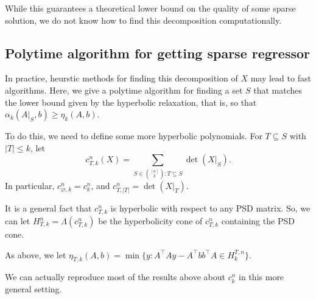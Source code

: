 \documentclass[a4paper]{article}
\newcommand{\ksets}{\binom{[n]}{k}}
\begin{document}
While this guarantees a theoretical lower bound on the quality of some sparse solution, we do not know how to find this decomposition computationally.

\subsection{Polytime algorithm for getting sparse regressor}
In practice, heurstic methods for finding this decomposition of $X$ may lead to fast algorithms.
Here, we give a polytime algorithm for finding a set $S$ that matches the lower bound given by the hyperbolic relaxation, that is, so that $\alpha_k(A|_S, b) \ge \eta_k(A, b)$.

To do this, we need to define some more hyperbolic polynomials. For $T \subseteq S$ with  $|T| \le k$, let
\[
    c_{T,k}^n(X) = \sum_{S\in \ksets : T \subseteq S} \det(X|_S).
\]
In particular, $c_{\varnothing, k}^n = c_k^n$, and $c_{T, |T|}^n = \det(X|_T)$.

It is a general fact that $c_{T,k}^n$ is hyperbolic with respect to any PSD matrix.
So, we can let $H_{T, k}^n = \Lambda(c_{T,k}^n)$ be the hyperbolicity cone of $c_{T,k}^n$ containing the PSD cone.

As above, we let $\eta_{T, k}(A,b) = \min \{y : A^{\intercal}A y - A^{\intercal}bb^{\intercal}A \in H^{T,n}_k\}$.

We can actually reproduce most of the results above about $c_k^n$ in this more general setting.
\end{document}
